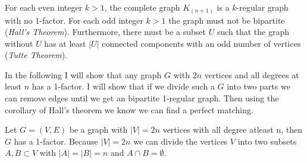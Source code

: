 \documentclass[a4paper]{article}
\begin{document}
	\newpage
	\begin{solution}{11}
		For each even integer $k > 1$, the complete graph $K_{(n+1)}$ is a $k$-regular graph with no 1-factor. For each odd integer $k > 1$ the graph must not be bipartite (\emph{Hall's Theorem}). Furthermore, there must be a subset $U$ such that the graph without $U$ has at least $|U|$ connected components with an odd number of vertices (\emph{Tutte Theorem}).
	\end{solution} 
	\newpage
	\begin{solution}{12}
	In the following I will show that any graph $G$ with $2n$ vertices and all degrees at least $n$ has a 1-factor. 	
	I will show that if we divide such a $G$ into two parts we can remove edges until we get an bipartite 1-regular graph. 
	Then using the corollary of Hall's theorem we know we can find a perfect matching.
		\begin{theorem}{Let $G=(V,E)$ be a graph with $|V| = 2n$ vertices with all degree atleast n, then $G$ has a 1-factor.}
		Because $|V| = 2n$ we can divide the vertices $V$ into two subsets $A,B \subset V$ with $|A|=|B|=n$ and $A \cap B = \emptyset$. 
		
	
		\end{theorem}
	\end{solution}
	
\end{document}
